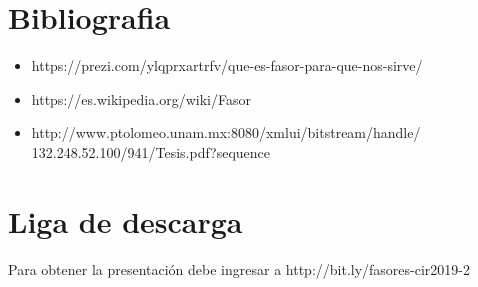 \documentclass{mylib/reporte}
\begin{document}
\section{Bibliografia}

\begin{itemize}
	\item https://prezi.com/ylqprxartrfv/que-es-fasor-para-que-nos-sirve/
	\item https://es.wikipedia.org/wiki/Fasor
	\item http://www.ptolomeo.unam.mx:8080/xmlui/bitstream/handle/\\
		132.248.52.100/941/Tesis.pdf?sequence

\end{itemize}

\section{Liga de descarga}

Para obtener la presentación debe ingresar a http://bit.ly/fasores-cir2019-2
\end{document}
